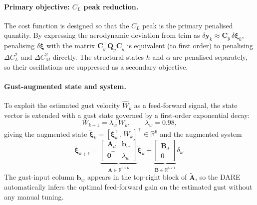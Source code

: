 \documentclass[11pt,a4paper]{article}
\newcommand{\vxi}{\bm{\xi}}
\newcommand{\vy}{\bm{y}}
\newcommand{\mA}{\mathbf{A}}
\newcommand{\mB}{\mathbf{B}}
\newcommand{\mC}{\mathbf{C}}
\newcommand{\mQ}{\mathbf{Q}}
\begin{document}
\paragraph{Primary objective: $C_L$ peak reduction.}
The cost function is designed so that the $C_L$ peak is the primary penalised
quantity.
By expressing the aerodynamic deviation from trim as
$\delta\vy_k \approx \mC_y\,\delta\vxi_k$,
penalising $\delta\vxi$ with the matrix $\mC_y^\top \mQ_y \mC_y$ is equivalent
(to first order) to penalising $\Delta C_L^2$ and $\Delta C_M^2$ directly.
The structural states $h$ and $\alpha$ are penalised separately, so their
oscillations are suppressed as a secondary objective.

\paragraph{Gust-augmented state and system.}
To exploit the estimated gust velocity $\hat{W}_k$ as a feed-forward signal,
the state vector is extended with a gust state governed by a first-order
exponential decay:
\begin{equation}
  W_{k+1} = \lambda_w\, W_k, \qquad \lambda_w = 0.98,
  \label{eq:gust_model}
\end{equation}
giving the augmented state $\tilde{\vxi}_k = [\vxi_k^\top,\, W_k]^\top
\in \mathbb{R}^6$ and the augmented system
\begin{equation}
  \tilde{\vxi}_{k+1}
  =
  \underbrace{\begin{bmatrix} \mA_d & \mathbf{b}_w \\ \mathbf{0}^\top & \lambda_w \end{bmatrix}}_{\tilde{\mA} \in \mathbb{R}^{6\times6}}
  \tilde{\vxi}_k
  +
  \underbrace{\begin{bmatrix} \mB_d \\ 0 \end{bmatrix}}_{\tilde{\mB} \in \mathbb{R}^{6\times1}}
  \delta_k.
  \label{eq:aug_sys}
\end{equation}
The gust-input column $\mathbf{b}_w$ appears in the top-right block of
$\tilde{\mA}$, so the DARE automatically infers the optimal feed-forward gain
on the estimated gust without any manual tuning.
\end{document}
